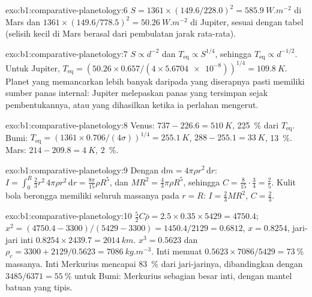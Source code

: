 \begin{solution}{exo:b1:comparative-planetology:6}
$S = 1361\times(149.6/228.0)^2 = \qty{585.9}{W.m^{-2}}$ di Mars dan
$1361\times(149.6/778.5)^2 = \qty{50.26}{W.m^{-2}}$ di Jupiter, sesuai
dengan tabel (selisih kecil di Mars berasal dari pembulatan jarak rata-rata).
\end{solution}

\begin{solution}{exo:b1:comparative-planetology:7}
$S \propto d^{-2}$ dan $T_\mathrm{eq} \propto S^{1/4}$, sehingga $T_\mathrm{eq}
\propto d^{-1/2}$. Untuk Jupiter, $T_\mathrm{eq} = (50.26\times0.657/(4\times
\num{5.6704e-8}))^{1/4} = \qty{109.8}{K}$. Planet yang memancarkan lebih banyak daripada yang diserapnya pasti memiliki sumber panas internal: Jupiter melepaskan panas yang tersimpan sejak pembentukannya, atau yang dihasilkan ketika ia perlahan mengerut.
\end{solution}

\begin{solution}{exo:b1:comparative-planetology:8}
Venus: $737 - 226.6 = \qty{510}{K}$, \qty{225}{\percent} dari $T_\mathrm{eq}$.
Bumi: $T_\mathrm{eq} = (1361\times0.706/(4\sigma))^{1/4} = \qty{255.1}{K}$,
$288 - 255.1 = \qty{33}{K}$, \qty{13}{\percent}. Mars: $214 - 209.8 =
\qty{4}{K}$, \qty{2}{\percent}.
\end{solution}

\begin{solution}{exo:b1:comparative-planetology:9}
Dengan $\mathrm dm = 4\pi\rho r^2\,\mathrm dr$: $I = \int_0^R\tfrac23r^2\,4\pi
\rho r^2\,\mathrm dr = \tfrac{8\pi}{15}\rho R^5$, dan $MR^2 = \tfrac43\pi\rho
R^5$, sehingga $C = \tfrac{8}{15}\cdot\tfrac34 = \tfrac25$. Kulit bola berongga memiliki seluruh massanya pada $r = R$: $I = \tfrac23MR^2$, $C = \tfrac23$.
\end{solution}

\begin{solution}{exo:b1:comparative-planetology:10}
$\tfrac52C\bar\rho = 2.5\times0.35\times5429 = 4750.4$;
$x^2 = (4750.4 - 3300)/(5429 - 3300) = 1450.4/2129 = 0.6812$, $x = 0.8254$,
jari-jari inti $0.8254\times2439.7 = \qty{2014}{km}$. $x^3 = 0.5623$ dan
$\rho_c = 3300 + 2129/0.5623 = \qty{7086}{kg.m^{-3}}$. Inti memuat
$0.5623\times7086/5429 = \qty{73}{\percent}$ massanya. Inti Merkurius
mencapai \qty{83}{\percent} dari jari-jarinya, dibandingkan dengan $3485/6371 =
\qty{55}{\percent}$ untuk Bumi: Merkurius sebagian besar inti, dengan mantel batuan yang tipis.
\end{solution}

